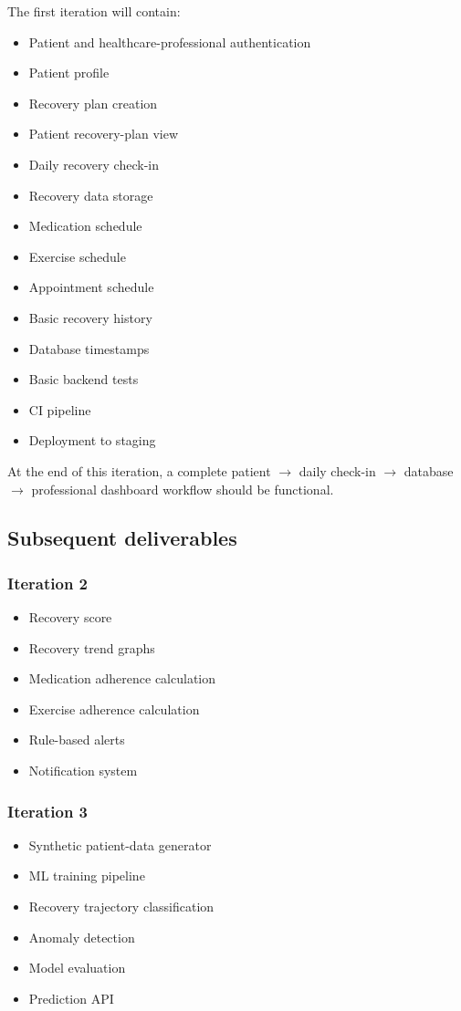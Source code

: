 \documentclass[11pt,a4paper]{article}
\begin{document}
The first iteration will contain:
\begin{itemize}[leftmargin=0.7cm]
    \item Patient and healthcare-professional authentication
    \item Patient profile
    \item Recovery plan creation
    \item Patient recovery-plan view
    \item Daily recovery check-in
    \item Recovery data storage
    \item Medication schedule
    \item Exercise schedule
    \item Appointment schedule
    \item Basic recovery history
    \item Database timestamps
    \item Basic backend tests
    \item CI pipeline
    \item Deployment to staging
\end{itemize}

At the end of this iteration, a complete patient $\rightarrow$ daily
check-in $\rightarrow$ database $\rightarrow$ professional dashboard workflow should be functional.

\subsection{Subsequent deliverables}

\subsubsection{Iteration 2}
\begin{itemize}[leftmargin=0.7cm]
    \item Recovery score
    \item Recovery trend graphs
    \item Medication adherence calculation
    \item Exercise adherence calculation
    \item Rule-based alerts
    \item Notification system
\end{itemize}

\subsubsection{Iteration 3}
\begin{itemize}[leftmargin=0.7cm]
    \item Synthetic patient-data generator
    \item ML training pipeline
    \item Recovery trajectory classification
    \item Anomaly detection
    \item Model evaluation
    \item Prediction API
\end{itemize}
\end{document}
